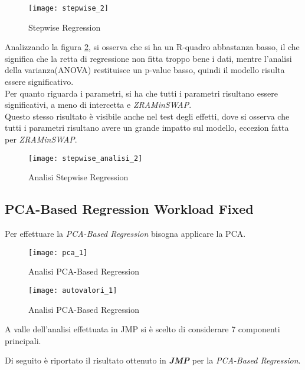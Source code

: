 \begin{figure}[!htbp]
  \centering
  \texttt{[image: stepwise\_2]}
  \caption{Stepwise Regression}
  \label{stepwise_2}
\end{figure}
\clearpage
Analizzando la figura \ref{stepwise_analisi_2}, si osserva che si ha un R-quadro
abbastanza basso, il che significa che la retta di regressione non fitta troppo
bene i dati, mentre l'analisi della varianza(ANOVA) restituisce un p-value basso,
quindi il modello risulta essere significativo.\\
Per quanto riguarda i parametri, si ha che tutti i parametri risultano essere
significativi, a meno di intercetta e \textit{ZRAMinSWAP}.\\
Questo stesso risultato è visibile anche nel test degli effetti, dove si osserva
che tutti i parametri risultano avere un grande impatto sul modello, eccezion
fatta per \textit{ZRAMinSWAP}.\\
\begin{figure}[!htbp]
  \centering
  \texttt{[image: stepwise\_analisi\_2]}
  \caption{Analisi Stepwise Regression}
  \label{stepwise_analisi_2}
\end{figure}

\clearpage

\subsection{PCA-Based Regression Workload Fixed}

Per effettuare la \textit{PCA-Based Regression} bisogna applicare la PCA.\\

\begin{figure}[!htbp]
  \centering
  \texttt{[image: pca\_1]}
  \caption{Analisi PCA-Based Regression}
  \label{pca_2}
\end{figure}

\begin{figure}[!htbp]
  \centering
  \texttt{[image: autovalori\_1]}
  \caption{Analisi PCA-Based Regression}
  \label{autovalori_2}
\end{figure}

A valle dell'analisi effettuata in JMP si è scelto di considerare 7 componenti
principali.\\

\clearpage

Di seguito è riportato il risultato ottenuto in \textbf{\textit{JMP}} per
la \textit{PCA-Based Regression}.\\

